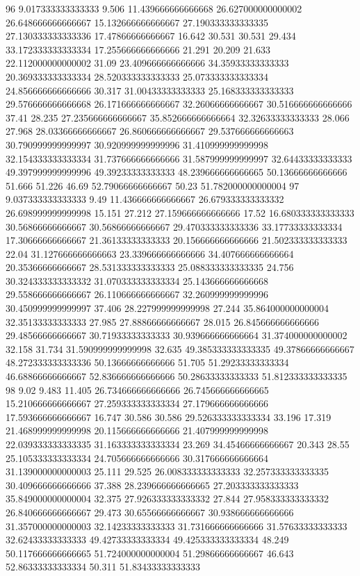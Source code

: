 96 9.017333333333333 9.506 11.439666666666668 26.627000000000002 26.648666666666667 15.132666666666667 27.190333333333335 27.130333333333336 17.47866666666667 16.642 30.531 30.531 29.434 33.172333333333334 17.255666666666666 21.291 20.209 21.633 22.112000000000002 31.09 23.409666666666666 34.35933333333333 20.369333333333334 28.520333333333333 25.073333333333334 24.856666666666666 30.317 31.00433333333333 25.168333333333333 29.576666666666668 26.171666666666667 32.26066666666667 30.516666666666666 37.41 28.235 27.235666666666667 35.852666666666664 32.32633333333333 28.066 27.968 28.03366666666667 26.860666666666667 29.537666666666663 30.790999999999997 30.920999999999996 31.410999999999998 32.154333333333334 31.737666666666666 31.587999999999997 32.64433333333333 49.397999999999996 49.39233333333333 48.239666666666665 50.13666666666666 51.666 51.226 46.69 52.79066666666667 50.23 51.782000000000004
97 9.037333333333333 9.49 11.436666666666667 26.679333333333332 26.698999999999998 15.151 27.212 27.159666666666666 17.52 16.680333333333333 30.56866666666667 30.56866666666667 29.470333333333336 33.17733333333334 17.30666666666667 21.36133333333333 20.156666666666666 21.502333333333333 22.04 31.127666666666663 23.339666666666666 34.407666666666664 20.35366666666667 28.531333333333333 25.088333333333335 24.756 30.324333333333332 31.070333333333334 25.143666666666668 29.558666666666667 26.110666666666667 32.260999999999996 30.450999999999997 37.406 28.227999999999998 27.244 35.864000000000004 32.35133333333333 27.985 27.88866666666667 28.015 26.845666666666666 29.48566666666667 30.71933333333333 30.939666666666664 31.374000000000002 32.158 31.734 31.590999999999998 32.635 49.385333333333335 49.37866666666667 48.272333333333336 50.13666666666666 51.705 51.29233333333334 46.68866666666667 52.836666666666666 50.28633333333333 51.812333333333335
98 9.02 9.483 11.405 26.734666666666666 26.745666666666665 15.210666666666667 27.259333333333334 27.179666666666666 17.593666666666667 16.747 30.586 30.586 29.526333333333334 33.196 17.319 21.468999999999998 20.115666666666666 21.407999999999998 22.039333333333335 31.163333333333334 23.269 34.45466666666667 20.343 28.55 25.105333333333334 24.705666666666666 30.317666666666664 31.139000000000003 25.111 29.525 26.008333333333333 32.257333333333335 30.409666666666666 37.388 28.239666666666665 27.203333333333333 35.849000000000004 32.375 27.926333333333332 27.844 27.958333333333332 26.840666666666667 29.473 30.65566666666667 30.938666666666666 31.357000000000003 32.14233333333333 31.731666666666666 31.57633333333333 32.62433333333333 49.42733333333334 49.425333333333334 48.249 50.117666666666665 51.724000000000004 51.29866666666667 46.643 52.86333333333334 50.311 51.83433333333333
